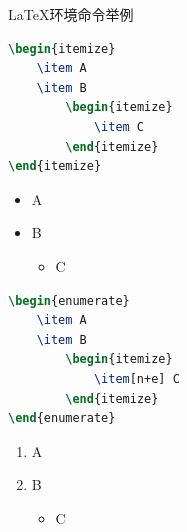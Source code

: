 \begin{frame}[fragile]{\LaTeX 环境命令举例}
    \small
    \begin{minipage}{0.5\linewidth}
\begin{lstlisting}[language=TeX]
\begin{itemize}
    \item A
    \item B
        \begin{itemize}
            \item C
        \end{itemize}
\end{itemize}
\end{lstlisting}
    \end{minipage}\hspace{1cm}
    \begin{minipage}{0.3\linewidth}
        \begin{itemize}
            \item A
            \item B
                \begin{itemize}
                    \item C
                \end{itemize}
        \end{itemize}
    \end{minipage}
    \medskip
    \pause
    \begin{minipage}{0.5\linewidth}
\begin{lstlisting}[language=TeX]
\begin{enumerate}
    \item A
    \item B
        \begin{itemize}
            \item[n+e] C
        \end{itemize}
\end{enumerate}
\end{lstlisting}
    \end{minipage}\hspace{1cm}
    \begin{minipage}{0.3\linewidth}
        \begin{enumerate}
            \item A
            \item B
                \begin{itemize}
                    \item[n+e] C
                \end{itemize}
        \end{enumerate}
    \end{minipage}
\end{frame}

